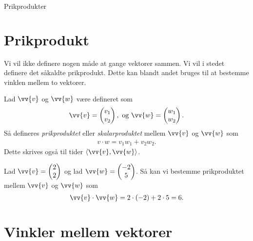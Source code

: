 \begin{center}
\Huge
Prikprodukter
\end{center}


\section*{Prikprodukt}

Vi vil ikke definere nogen måde at gange vektorer sammen. Vi vil i stedet definere det såkaldte prikprodukt. Dette kan blandt andet bruges til at bestemme vinklen mellem to vektorer. 
\begin{defn}
Lad $\vv{v}$ og $\vv{w}$ være defineret som
\begin{align*}
\vv{v} = \begin{pmatrix}
v_1\\ v_2
\end{pmatrix}, \textnormal{ og }\vv{w} = \begin{pmatrix}w_1 \\ w_2
\end{pmatrix}.
\end{align*}
Så defineres \textit{prikproduktet} eller \textit{skalarproduktet} mellem $\vv{v}$ og $\vv{w}$ som
\begin{align*}
v\cdot w = v_1w_1 + v_2w_2.
\end{align*}
Dette skrives også til tider $\langle \vv{v}, \vv{w} \rangle$. 
\end{defn}
\begin{exa}
Lad $\vv{v} = \begin{pmatrix}
2 \\ 2
\end{pmatrix}$ og lad $\vv{w} = \begin{pmatrix}
-2 \\ 5
\end{pmatrix}$. Så kan vi bestemme prikproduktet mellem $\vv{v}$ og $\vv{w}$ som
\begin{align*}
\vv{v} \cdot \vv{w} = 2\cdot(-2)+2\cdot 5 = 6.
\end{align*}
\end{exa}

\section*{Vinkler mellem vektorer}

